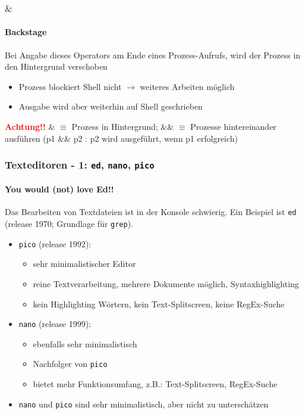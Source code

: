 \documentclass[12pt,utf8, handout]{beamer}
\begin{document}
\begin{frame}
\frametitle{$\&$}
\framesubtitle{Backstage}
Bei Angabe dieses Operators am Ende eines Prozess-Aufrufs, wird der Prozess in den Hintergrund verschoben
\begin{itemize}[<+->]
	\item Prozess blockiert Shell nicht $\to$ weiteres Arbeiten möglich
	\item Ausgabe wird aber weiterhin auf Shell geschrieben
\end{itemize}
\textbf{\textcolor{red}{Achtung!!}} $\&$ $\equiv$ Prozess in Hintergrund; $\&\&$ $\equiv$ Prozesse hintereinander ausführen (p1 $\&\&$ p2 : p2 wird ausgeführt, wenn p1 erfolgreich)
\end{frame}

\begin{frame}
\frametitle{Texteditoren - 1: \texttt{ed}, \texttt{nano}, \texttt{pico}}
\framesubtitle{\textcolor{ownDarkOr}{You would (not) love Ed!!}}
Das Bearbeiten von Textdateien ist in der Konsole schwierig. Ein Beispiel ist \texttt{ed} (release 1970; Grundlage für \texttt{grep}).
\begin{itemize}
	\item \texttt{pico} (release 1992):
	\begin{itemize}[<+->]
		\item {\scriptsize sehr minimalistischer Editor}
		\item {\scriptsize reine Textverarbeitung, mehrere Dokumente möglich, Syntaxhighlighting}
		\item {\scriptsize kein Highlighting Wörtern, kein Text-Splitscreen, keine RegEx-Suche}
	\end{itemize}
	\item \texttt{nano} (release 1999):
	\begin{itemize}[<+->]
		\item {\scriptsize ebenfalls sehr minimalistisch}
		\item {\scriptsize Nachfolger von \texttt{pico}}
		\item {\scriptsize bietet mehr Funktionsumfang, z.B.: Text-Splitscreen, RegEx-Suche}
	\end{itemize}
	\item \texttt{nano} und \texttt{pico} sind sehr minimalistisch, aber nicht zu unterschätzen
\end{itemize}
\end{frame}
\end{document}
